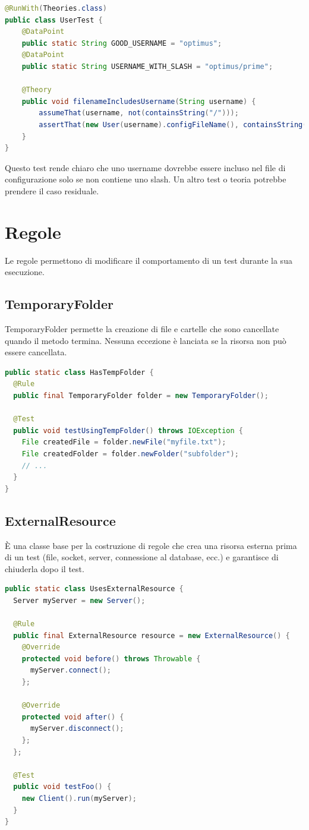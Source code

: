 \documentclass[11pt,a4paper]{book}
\begin{document}
\begin{lstlisting}[language = Java]
@RunWith(Theories.class)
public class UserTest {
    @DataPoint
    public static String GOOD_USERNAME = "optimus";
    @DataPoint
    public static String USERNAME_WITH_SLASH = "optimus/prime";

    @Theory
    public void filenameIncludesUsername(String username) {
        assumeThat(username, not(containsString("/")));
        assertThat(new User(username).configFileName(), containsString(username));
    }
}
\end{lstlisting}

Questo test rende chiaro che uno username dovrebbe essere incluso nel file di configurazione solo se non contiene uno slash. Un altro test o teoria potrebbe prendere il caso residuale.

\section{Regole}
Le regole permettono di modificare il comportamento di un test durante la sua esecuzione.

\subsection{TemporaryFolder}
TemporaryFolder permette la creazione di file e cartelle che sono cancellate quando il metodo termina. Nessuna eccezione è lanciata se la risorsa non può essere cancellata.

\begin{lstlisting}[language = Java]
public static class HasTempFolder {
  @Rule
  public final TemporaryFolder folder = new TemporaryFolder();

  @Test
  public void testUsingTempFolder() throws IOException {
    File createdFile = folder.newFile("myfile.txt");
    File createdFolder = folder.newFolder("subfolder");
    // ...
  }
} 
\end{lstlisting}

\subsection{ExternalResource}
È una classe base per la costruzione di regole che crea una risorsa esterna prima di un test (file, socket, server, connessione al database, ecc.) e garantisce di chiuderla dopo il test.

\begin{lstlisting}[language = Java]
public static class UsesExternalResource {
  Server myServer = new Server();
  
  @Rule
  public final ExternalResource resource = new ExternalResource() {
    @Override
    protected void before() throws Throwable {
      myServer.connect();
    };
    
    @Override
    protected void after() {
      myServer.disconnect();
    };
  };
  
  @Test
  public void testFoo() {
    new Client().run(myServer);
  }
}
\end{lstlisting}
\end{document}
